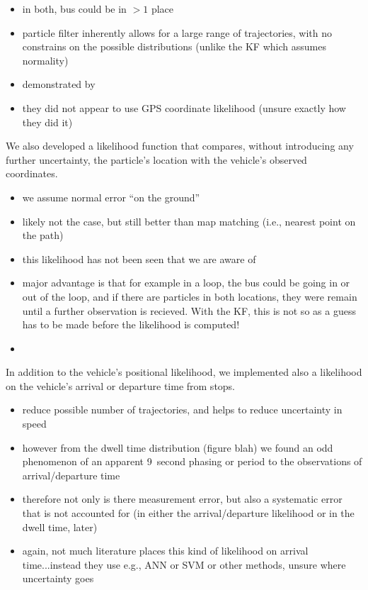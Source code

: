 \begin{itemize}
  \item in both, bus could be in $>1$ place
  \item particle filter inherently allows for a large range of trajectories, with no constrains on the possible distributions (unlike the KF which assumes normality)
  \item demonstrated by \citet{Hans_2015}
  \item they did not appear to use GPS coordinate likelihood (unsure exactly how they did it)
\end{itemize}


We also developed a likelihood function that compares, without introducing any further uncertainty, the particle's location with the vehicle's observed coordinates.
\begin{itemize}
  \item we assume normal error ``on the ground''
  \item likely not the case, but still better than map matching (i.e., nearest point on the path)
  \item this likelihood has not been seen that we are aware of
  \item major advantage is that for example in a loop, the bus could be going in or out of the loop, and if there are particles in both locations, they were remain until a further observation is recieved. With the KF, this is not so as a guess has to be made before the likelihood is computed!
  \item \citep{Cathey_2003,cn}
\end{itemize}


In addition to the vehicle's positional likelihood, we implemented also a likelihood on the vehicle's arrival or departure time from stops.
\begin{itemize}
  \item reduce possible number of trajectories, and helps to reduce uncertainty in speed
  \item however from the dwell time distribution (figure blah) we found an odd phenomenon of an apparent 9~second phasing or period to the observations of arrival/departure time
  \item therefore not only is there measurement error, but also a systematic error that is not accounted for (in either the arrival/departure likelihood or in the dwell time, later)

  \item again, not much literature places this kind of likelihood on arrival time...instead they use e.g., ANN or SVM or other methods, unsure where uncertainty goes

\end{itemize}


